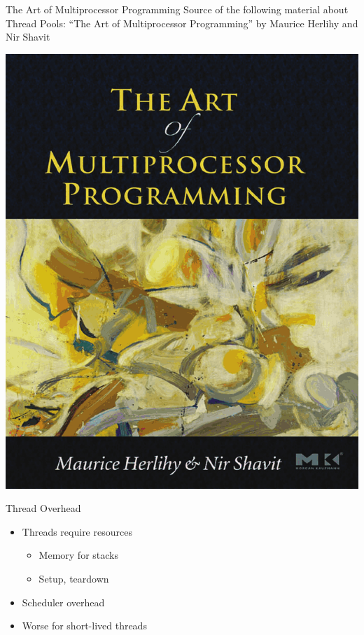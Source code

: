\begin{frame}{The Art of Multiprocessor Programming}
  Source of the following material about Thread Pools: ``The Art of
  Multiprocessor Programming'' by Maurice Herlihy and Nir Shavit


  \begin{center}
    \includegraphics[scale=0.28]{figures/book-herlihy}
  \end{center}
\end{frame}

\begin{frame}{Thread Overhead}
  \begin{itemize}
  \item Threads require resources
    \begin{itemize}
    \item Memory for stacks
    \item Setup, teardown
    \end{itemize}
  \item Scheduler overhead
  \item Worse for short-lived threads
  \end{itemize}
\end{frame}

